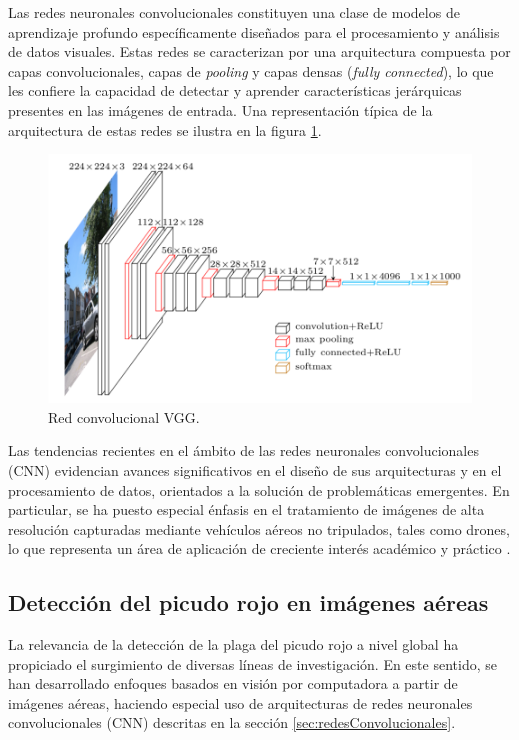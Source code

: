 Las redes neuronales convolucionales constituyen una clase de modelos de aprendizaje profundo específicamente diseñados para el procesamiento y análisis de datos visuales. Estas redes se caracterizan por una arquitectura compuesta por capas convolucionales, capas de \textit{pooling} y capas densas (\textit{fully connected}), lo que les confiere la capacidad de detectar y aprender características jerárquicas presentes en las imágenes de entrada. Una representación típica de la arquitectura de estas redes se ilustra en la figura \ref{fig:vgg}.

\begin{figure}[htpb]
  \centering
  \includegraphics[scale=0.8]{./Figures/vgg.png}
  \caption{Red convolucional VGG\protect\footnotemark.}
  \label{fig:vgg}
\end{figure}


Las tendencias recientes en el ámbito de las redes neuronales convolucionales (CNN) evidencian avances significativos en el diseño de sus arquitecturas y en el procesamiento de datos, orientados a la solución de problemáticas emergentes. En particular, se ha puesto especial énfasis en el tratamiento de imágenes de alta resolución capturadas mediante vehículos aéreos no tripulados, tales como drones, lo que representa un área de aplicación de creciente interés académico y práctico \citep{gao_recent_2024} \citep{sutar_convolutional_2025}.

\subsection{Detección del picudo rojo en imágenes aéreas}

La relevancia de la detección de la plaga del picudo rojo a nivel global ha propiciado el surgimiento de diversas líneas de investigación. En este sentido, se han desarrollado enfoques basados en visión por computadora a partir de imágenes aéreas, haciendo especial uso de arquitecturas de redes neuronales convolucionales (CNN) descritas en la sección \ref{sec:redesConvolucionales}.

